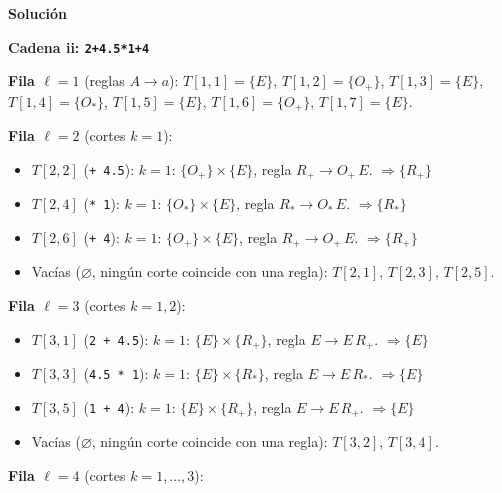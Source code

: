 \documentclass[12pt, letterpaper]{article}
\newenvironment{solucion}{\par\medskip\noindent\textbf{\large Solución}\par\smallskip}{\par\bigskip}
\begin{document}
\begin{enumerate}
\begin{solucion}
  
  \medskip\noindent\textbf{Cadena ii: \texttt{2+4.5*1+4}}
  
  \textbf{Fila $\ell=1$} (reglas $A \to a$): $T[1,1] = \{E\}$, $T[1,2] = \{O_{+}\}$, $T[1,3] = \{E\}$, $T[1,4] = \{O_{*}\}$, $T[1,5] = \{E\}$, $T[1,6] = \{O_{+}\}$, $T[1,7] = \{E\}$.
  
  \textbf{Fila $\ell=2$} (cortes $k=1$):
  
  \begin{itemize}[leftmargin=*,itemsep=0pt]
    
  \item $T[2,2]$ (\texttt{+ 4.5}): $k=1$: $\{O_{+}\} \times \{E\}$, regla $R_{+} \to O_{+}\,E$. $\Rightarrow \{R_{+}\}$
    
  \item $T[2,4]$ (\texttt{* 1}): $k=1$: $\{O_{*}\} \times \{E\}$, regla $R_{*} \to O_{*}\,E$. $\Rightarrow \{R_{*}\}$
    
  \item $T[2,6]$ (\texttt{+ 4}): $k=1$: $\{O_{+}\} \times \{E\}$, regla $R_{+} \to O_{+}\,E$. $\Rightarrow \{R_{+}\}$
    
  \item Vacías ($\varnothing$, ningún corte coincide con una regla): $T[2,1]$, $T[2,3]$, $T[2,5]$.
    
  \end{itemize}
  
  \textbf{Fila $\ell=3$} (cortes $k=1,2$):
  
  \begin{itemize}[leftmargin=*,itemsep=0pt]
    
  \item $T[3,1]$ (\texttt{2 + 4.5}): $k=1$: $\{E\} \times \{R_{+}\}$, regla $E \to E\,R_{+}$. $\Rightarrow \{E\}$
    
  \item $T[3,3]$ (\texttt{4.5 * 1}): $k=1$: $\{E\} \times \{R_{*}\}$, regla $E \to E\,R_{*}$. $\Rightarrow \{E\}$
    
  \item $T[3,5]$ (\texttt{1 + 4}): $k=1$: $\{E\} \times \{R_{+}\}$, regla $E \to E\,R_{+}$. $\Rightarrow \{E\}$
    
  \item Vacías ($\varnothing$, ningún corte coincide con una regla): $T[3,2]$, $T[3,4]$.
    
  \end{itemize}
  
  \textbf{Fila $\ell=4$} (cortes $k=1,\dots,3$):
  

\end{solucion}
\end{enumerate}
\end{document}
